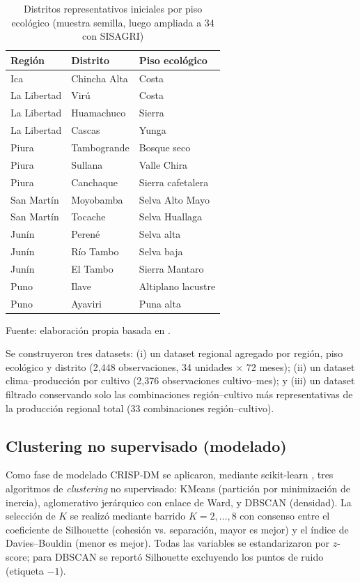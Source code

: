 \documentclass[conference]{IEEEtran}
\begin{document}
\begin{table}[h]
\centering
\caption{Distritos representativos iniciales por piso ecológico (muestra semilla, luego ampliada a 34 con SISAGRI)}
\label{tab:distritos}
\small
\begin{tabular}{l l l}
\toprule
\textbf{Región} & \textbf{Distrito} & \textbf{Piso ecológico} \\
\midrule
Ica & Chincha Alta & Costa \\
La Libertad & Virú & Costa \\
La Libertad & Huamachuco & Sierra \\
La Libertad & Cascas & Yunga \\
Piura & Tambogrande & Bosque seco \\
Piura & Sullana & Valle Chira \\
Piura & Canchaque & Sierra cafetalera \\
San Martín & Moyobamba & Selva Alto Mayo \\
San Martín & Tocache & Selva Huallaga \\
Junín & Perené & Selva alta \\
Junín & Río Tambo & Selva baja \\
Junín & El Tambo & Sierra Mantaro \\
Puno & Ilave & Altiplano lacustre \\
Puno & Ayaviri & Puna alta \\
\bottomrule
\end{tabular}
\end{table}

{\footnotesize Fuente: elaboración propia basada en \cite{redesarrolloica2021, esan2023, cepiura2023, dataperu2021, inei1996, midagripuno2020}.}

Se construyeron tres datasets: (i) un dataset regional agregado por región, piso ecológico y distrito (2{,}448 observaciones, 34 unidades $\times$ 72 meses); (ii) un dataset clima--producción por cultivo (2{,}376 observaciones cultivo--mes); y (iii) un dataset filtrado conservando solo las combinaciones región--cultivo más representativas de la producción regional total (33 combinaciones región--cultivo).

\subsection{Clustering no supervisado (modelado)}
\label{ssec:modelado}
Como fase de modelado CRISP-DM se aplicaron, mediante scikit-learn \cite{pedregosa2011sklearn}, tres algoritmos de \textit{clustering} no supervisado: KMeans (partición por minimización de inercia), aglomerativo jerárquico con enlace de Ward, y DBSCAN (densidad). La selección de $K$ se realizó mediante barrido $K=2,\dots,8$ con consenso entre el coeficiente de Silhouette (cohesión vs. separación, mayor es mejor) y el índice de Davies--Bouldin (menor es mejor). Todas las variables se estandarizaron por $z$-score; para DBSCAN se reportó Silhouette excluyendo los puntos de ruido (etiqueta $-1$).
\end{document}

